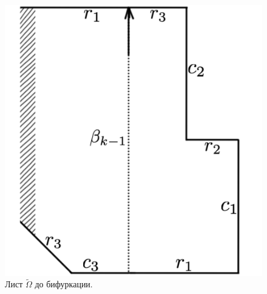 \begin{figure}[!htb]
\centering
\includegraphics[scale=0.11]{images/ch4/section3_circular/atoms/III/page_segment_1.pdf}
    \caption{Лист $\widetilde{\Omega}$ до бифуркации.}
    \label{fig:pt10:_III_page_segment_1}
\endminipage\hfill
{}
\centering

\end{figure}
